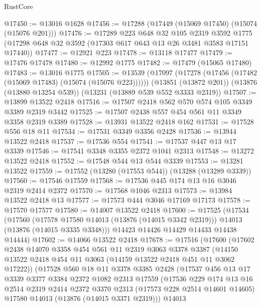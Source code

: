\begin{lexlean}{RustCore}
\begin{coremodule}
@17450 := @13016 @1628
@17456 := @17288 (@17449 (@15069 @17450) (@15074 (@15076 @201)))
@17476 := @17289
    @223
    @648
    @32
    @105
    @2319
    @3592
    @1775
    (@17298 @648 @32 @3592 (@17303 @617 @643 @13 @26 @3481 @3583 @17151 @17440))
@17477 := @12921 @223
@17478 := @13118 @17477
@17479 := @17476 @17478
@17480 := @12992 @1775
@17482 := @17479 (@15065 @17480)
@17483 := @13016 @1775
@17505 := @13539
    (@17097 (@17278 (@17456 (@17482 (@15069 @17483) (@15074 (@15076 @223))))))
    (@13851 (@13872 @201))
    (@13876 (@13880 @13254 @539))
    (@13231 (@13889 @539 @552 @3333 @2319))
@17507 := @13899 @13522 @2418
@17516 := @17507 @2418 @562 @570 @574 @105 @3349 @3389 @2319 @3442
@17525 := @17507 @2438 @557 @454 @561 @11 @3349 @3358 @2319 @3389
@17528 := @13931 @13522 @2418 @162
@17531 := @17528 @556 @18 @11
@17534 := @17531 @3349 @3356 @2428
@17536 := @13944 @13522 @2418
@17537 := @17536 @554
@17541 := @17537 @447 @13 @17 @3339
@17546 := @17541 @3348 @3355 @2372 @1041 @2313
@17548 := @13272 @13522 @2418
@17552 := @17548 @544 @13 @544 @3339
@17553 := @13281 @13522
@17559 := @17552 (@13280 (@17553 @544)) (@13288 (@13289 @3339))
@17560 := @17546 @17559
@17568 := @17536 @445 @174 @13 @16 @3046 @2319 @2414 @2372
@17570 := @17568 @1046 @2313
@17573 := @13984 @13522 @2418 @13
@17577 := @17573 @444 @3046 @17169 @17173
@17578 := @17570 @17577
@17580 := @14007 @13522 @2418
@17600 := @17525
    (@17534
      (@17560
        (@17578 @17580 @14013 (@13876 (@14015 @3342 @2319)))
        @14013
        (@13876 (@14015 @3335 @3348)))
      @14423
      @14426
      @14429
      @14433
      @14438
      @14444)
@17602 := @14066 @13522 @2418
@17678 := @17516
    (@17600
      (@17602
        @2438
        @14070
        @3358
        @454
        @561
        @11
        @2319
        @3063
        @3378
        @3387
        (@14150 @13522 @2418 @454 @11 @3063 (@14159 @13522 @2418 @451 @11 @3062 @17222))
        (@17528
          @560
          @18
          @11
          @3378
          @3385
          @2428
          (@17537
            @456
            @13
            @17
            @3339
            @3377
            @3384
            @2372
            @1082
            @2313
            @17559
            (@17536
              @229
              @174
              @13
              @16
              @2514
              @2319
              @2414
              @2372
              @3370
              @2313
              (@17573 @228 @2514 @14601 @14605)
              @17580
              @14013
              (@13876 (@14015 @3371 @2319)))
            @14013

\end{coremodule}
\end{lexlean}
